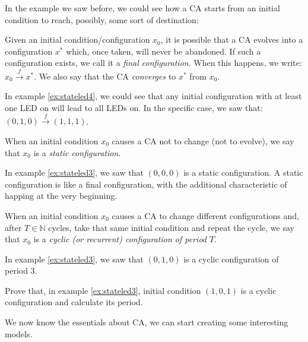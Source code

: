 In the example we saw before, we could see how a CA starts from an initial condition 
to reach, possibly, some sort of destination:

\begin{definition}
\label{def:finalconf}
Given an initial condition/configuration $x_0$, 
it is possible that a CA evolves into a configuration
$x^\ast$ which, once taken, will never be abandoned. If such a configuration exists, we call it
a \textit{final configuration}. When this happens, we write:
$x_0 \overset{f}{\rightarrow} x^\ast$.
We also say that the CA \textit{converges} to $x^\ast$ from $x_0$.
\end{definition}

In example \ref{ex:stateled4}, we could see that any initial configuration with at least one
LED on will lead to all LEDs on. In the specific case, we saw that:
$(0,1,0) \overset{f}{\rightarrow} (1,1,1)$.

\begin{definition}
\label{def:staticconf}
When an initial condition $x_0$ causes a CA not to change (not to evolve), we say that
$x_0$ is a \textit{static configuration}.
\end{definition}

In example \ref{ex:stateled3}, we saw that $(0,0,0)$ is a static configuration.
A static configuration is like a final configuration, with the additional characteristic
of happing at the very beginning.

\begin{definition}
\label{def:recconf}
When an initial condition $x_0$ causes a CA to change different configurations and, after
$T \in \mathbb{N}$ cycles, take that same initial condition and repeat the cycle, we say
that $x_0$ is a \textit{cyclic (or recurrent) configuration of period $T$}.
\end{definition}

In example \ref{ex:stateled3}, we saw that $(0,1,0)$ is a cyclic configuration of period 3.

\begin{problem}
\label{prob2}
Prove that, in example \ref{ex:stateled3}, initial condition $(1,0,1)$ is a cyclic configuration
and calculate its period.
\end{problem}

We now know the essentials about CA, we can start creating some interesting models.
